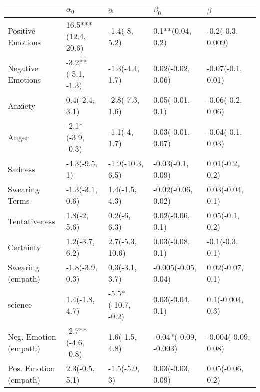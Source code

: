 \begin{tabular}{lllll}
\toprule
{} &           $\alpha_0$ &            $\alpha$ &              $\beta_0$ &              $\beta$ \\
\midrule
Positive Emotions     &  16.5***(12.4, 20.6) &       -1.4(-8, 5.2) &       0.1**(0.04, 0.2) &    -0.2(-0.3, 0.009) \\
Negative Emotions     &   -3.2**(-5.1, -1.3) &     -1.3(-4.4, 1.7) &      0.02(-0.02, 0.06) &    -0.07(-0.1, 0.01) \\
Anxiety               &       0.4(-2.4, 3.1) &     -2.8(-7.3, 1.6) &       0.05(-0.01, 0.1) &    -0.06(-0.2, 0.06) \\
Anger                 &    -2.1*(-3.9, -0.3) &       -1.1(-4, 1.7) &      0.03(-0.01, 0.07) &    -0.04(-0.1, 0.03) \\
Sadness               &        -4.3(-9.5, 1) &    -1.9(-10.3, 6.5) &      -0.03(-0.1, 0.09) &      0.01(-0.2, 0.2) \\
Swearing Terms        &      -1.3(-3.1, 0.6) &      1.4(-1.5, 4.3) &     -0.02(-0.06, 0.02) &     0.03(-0.04, 0.1) \\
Tentativeness         &         1.8(-2, 5.6) &        0.2(-6, 6.3) &       0.02(-0.06, 0.1) &      0.05(-0.1, 0.2) \\
Certainty             &       1.2(-3.7, 6.2) &     2.7(-5.3, 10.6) &       0.03(-0.08, 0.1) &      -0.1(-0.3, 0.1) \\
Swearing (empath)     &      -1.8(-3.9, 0.3) &      0.3(-3.1, 3.7) &    -0.005(-0.05, 0.04) &     0.02(-0.07, 0.1) \\
science               &       1.4(-1.8, 4.7) &  -5.5*(-10.7, -0.2) &       0.03(-0.04, 0.1) &     0.1(-0.004, 0.3) \\
Neg. Emotion (empath) &   -2.7**(-4.6, -0.8) &      1.6(-1.5, 4.8) &  -0.04*(-0.09, -0.003) &  -0.004(-0.09, 0.08) \\
Pos. Emotion (empath) &       2.3(-0.5, 5.1) &       -1.5(-5.9, 3) &      0.03(-0.03, 0.09) &     0.05(-0.06, 0.2) \\
\bottomrule
\end{tabular}
